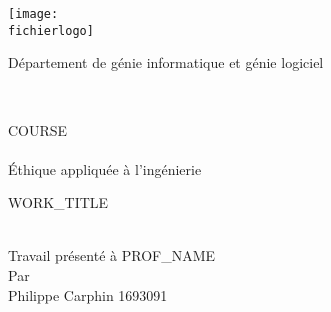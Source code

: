 \documentclass[12pt,titlepage]{article}
\newcommand{\letitre}{WORK_TITLE\\}
\newcommand{\presentea}{PROF_NAME\\}
\newcommand{\fichierlogo}{logo_poly.pdf}
\newcommand{\organisation}{Département de génie informatique et génie logiciel \\ }
\newcommand{\lenumcours}{COURSE\\}
\newcommand{\letitrecours}{Éthique appliquée à l'ingénierie}
\newcommand{\lauteur}{Philippe Carphin 1693091}
\begin{document}
\begin{titlepage}

\parbox[c]{1in}{\texttt{[image: \\fichierlogo]}}
\hfill \parbox[c]{3in}{\Large\raggedleft\organisation} \\
%
%
\begin{center}
\vfill
%
%
%
\large
\lenumcours \\
\letitrecours
%
%
\vfill
%
%
\parbox[b]{0.6\textwidth}{\center\letitre}\\
%
{\small Travail présenté à
\presentea}
%
\vfill
Par\\
\lauteur

\end{center}
\end{titlepage}
\end{document}
